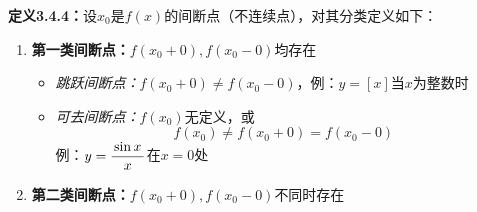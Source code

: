 {\bf 定义3.4.4：}设$x_0$是$f(x)$的间断点（不连续点），对其分类定义如下：
\begin{enumerate}[(1)]
  \setlength{\itemindent}{1cm}
  \item {\bf 第一类间断点：}$f(x_0+0),f(x_0-0)$均存在
  \begin{itemize}
    \item {\it 跳跃间断点：}$f(x_0+0)\ne f(x_0-0)$，例：$y=[x]$当$x$为整数时
    \begin{center}
 	\end{center}
    \item {\it 可去间断点：}$f(x_0)$无定义，或
    $$f(x_0)\ne f(x_0+0)=f(x_0-0)$$
    例：$y=\displaystyle\frac{\,{\sin x}\,}{\,{x}\,}$在$x=0$处
    \begin{center}
 	\end{center}
  \end{itemize}
  \item {\bf 第二类间断点：}$f(x_0+0),f(x_0-0)$不同时存在

\end{enumerate}
